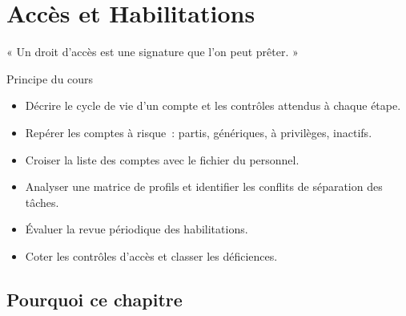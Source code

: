 
\chapter{Accès et Habilitations}
\label{chap:acces}

\epigraph{%
    « Un droit d'accès est une signature que l'on peut prêter. »%
}{Principe du cours}


\begin{boxobjectifs}
\begin{itemize}
    \item Décrire le cycle de vie d'un compte et les contrôles attendus à
          chaque étape.
    \item Repérer les comptes à risque~: partis, génériques, à privilèges,
          inactifs.
    \item Croiser la liste des comptes avec le fichier du personnel.
    \item Analyser une matrice de profils et identifier les conflits de
          séparation des tâches.
    \item Évaluer la revue périodique des habilitations.
    \item Coter les contrôles d'accès et classer les déficiences.
\end{itemize}
\end{boxobjectifs}

\bigskip

\section*{Pourquoi ce chapitre}

